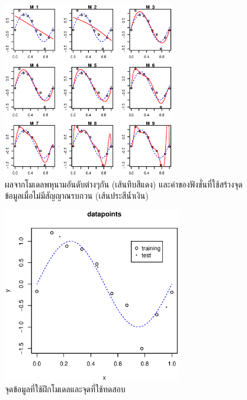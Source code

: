%
\begin{figure}
\begin{center}
\includegraphics[height=3.0in]{02Background/bgPolyMs.eps}
\end{center}
\caption{ผลจากโมเดลพหุนามอันดับต่างๆกัน (เส้นทึบสีแดง) 
และค่าของฟังชั่นที่ใช้สร้างจุดข้อมูลเมื่อไม่มีสัญญาณรบกวน (เส้นประสีน้ำเงิน)}
\label{fig: bg poly curve fitting Ms}
\end{figure}
%

%
\begin{figure}
\begin{center}
\includegraphics[height=3.0in]{02Background/bgAddTestPoints.eps}
\end{center}
\caption{จุดข้อมูลที่ใช้ฝึกโมเดลและจุดที่ใช้ทดสอบ}
\label{fig: bg train and test datapoints}
\end{figure}
%

